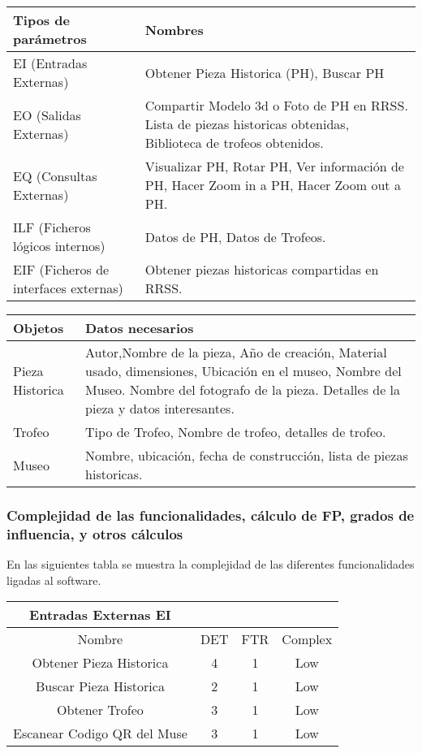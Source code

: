 \begin{tabular}{|p{5cm}|p{8cm}|}
\hline 
Tipos de parámetros & Nombres \\ 
\hline 
EI (Entradas Externas) & Obtener Pieza Historica (PH), Buscar PH \\ 
\hline 
EO (Salidas Externas) & Compartir Modelo 3d o Foto de PH en RRSS.
Lista de piezas historicas obtenidas, Biblioteca de trofeos obtenidos.
 \\ 
\hline 
EQ (Consultas Externas) & Visualizar PH, Rotar PH, Ver información de PH, Hacer Zoom in a PH, Hacer Zoom out a
PH.
 \\ 
\hline 
ILF (Ficheros lógicos internos) & Datos de PH, Datos de Trofeos. \\ 
\hline 
EIF (Ficheros de interfaces externas) & Obtener piezas historicas compartidas en
RRSS.
 \\ 
\hline 
\end{tabular} 

\begin{tabular}{|p{5cm}|p{8cm}|}
\hline 
Objetos & Datos necesarios \\ 
\hline 
Pieza Historica & Autor,Nombre de la pieza, Año de creación, Material
usado, dimensiones, Ubicación en el museo, Nombre del
Museo. Nombre del fotografo de la pieza. Detalles de la
pieza y datos interesantes. \\ 
\hline 
Trofeo & Tipo de Trofeo, Nombre de trofeo, detalles de trofeo. \\ 
\hline 
Museo & Nombre, ubicación, fecha de construcción, lista de piezas
historicas. \\ 
\hline 
\end{tabular} 

\subsubsection{Complejidad de las funcionalidades, cálculo de FP, grados de influencia, y otros cálculos}
En las siguientes tabla se muestra la complejidad de las diferentes funcionalidades ligadas al software.

\begin{tabular}{|c|c|c|c|}
\hline 
Entradas Externas EI &   &   &   \\ 
\hline 
Nombre & DET & FTR & Complex \\ 
\hline 
Obtener Pieza Historica & 4 & 1 & Low \\ 
\hline 
Buscar Pieza Historica & 2 & 1 & Low \\ 
\hline 
Obtener Trofeo & 3 & 1 & Low \\ 
\hline 
Escanear Codigo QR del Muse & 3 & 1 & Low \\ 
\hline 
\end{tabular}

